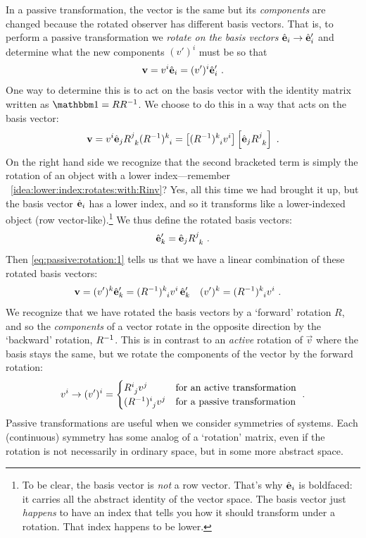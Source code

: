 \documentclass[12pt]{article}
\begin{document}
In a passive transformation, the vector is the same but its \emph{components} are changed because the rotated observer has different basis vectors. That is, to perform a passive transformation we \emph{rotate on the basis vectors} $\hat{\mathbf{e}}_i \to \hat{\mathbf{e}}'_i$ and determine what the new components $(v')^i$ must be so that
\begin{align}
    \mathbf{v} = v^i\hat{\mathbf{e}}_i = (v')^i\hat{\mathbf{e}}'_i \ .
\end{align}
One way to determine this is to act on the basis vector with the identity matrix written as $\one = R R\inv$. We choose to do this in a way that acts on the basis vector:
\begin{align}
    \vec{v} = v^{i} \bas{e}_j R\aij{j}{k}(R\inv)\aij{k}{i}  = \left[(R\inv)\aij{k}{i}v^i \right]\left[\bas{e}_j R\aij{j}{k}\right] \ .
    \label{eq:passive:rotation:1}
\end{align}
On the right hand side we recognize that the second bracketed term is simply the rotation of an object with a lower index---remember \bigidearef~\ref{idea:lower:index:rotates:with:Rinv}? Yes, all this time we had brought it up, but the basis vector $\hat{\mathbf{e}}_i$ has a lower index, and so it transforms like a lower-indexed object (row vector-like).\footnote{To be clear, the basis vector is \emph{not} a row vector. That's why $\hat{\mathbf{e}}_i$ is boldfaced: it carries all the abstract identity of the vector space. The basis vector just \emph{happens} to have an index that tells you how it should transform under a rotation. That index happens to be lower.} We thus define the rotated basis vectors:
\begin{align}
    \bas{e}_k' = \bas{e}_j R\aij{j}{k} \ .
\end{align}
Then \eqref{eq:passive:rotation:1} tells us that we have a linear combination of these rotated basis vectors:
\begin{align}
    \vec{v} &= 
    (v')^k
    \bas{e}_k'
    =
     (R\inv)\aij{k}{i}v^i \, \bas{e}'_k
     &
     (v')^k
     &=
     (R\inv)\aij{k}{i}v^i \ .
\end{align}
We recognize that we have rotated the basis vectors by a `forward' rotation $R$, and so the \emph{components} of a vector rotate in the opposite direction by the `backward' rotation, $R^{-1}$.  This is in contrast to an \emph{active} rotation of $\vec{v}$ where the basis stays the same, but we rotate the components of the vector by the forward rotation:
\begin{align}
    v^i \to (v')^i = 
    \begin{cases}
    R\aij{i}{j} v^j & \text{for an active transformation} \\
    (R\inv)\aij{i}{j} v^j & \text{for a passive transformation}
    \end{cases} \ .
\end{align}
Passive transformations are useful when we consider symmetries of systems. Each (continuous) symmetry has some analog of a `rotation' matrix, even if the rotation is not necessarily in ordinary space, but in some more abstract space. 
\end{document}
